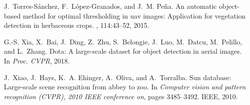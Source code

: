\documentclass[10pt,journal,compsoc]{IEEEtran}
\begin{document}
\begin{thebibliography}{10}
J.~Torres-S{\'a}nchez, F.~L{\'o}pez-Granados, and J.~M. Pe{\~n}a.
\newblock An automatic object-based method for optimal thresholding in uav
  images: Application for vegetation detection in herbaceous crops.
, 114:43--52, 2015.

G.-S. Xia, X.~Bai, J.~Ding, Z.~Zhu, S.~Belongie, J.~Luo, M.~Datcu, M.~Pelillo,
  and L.~Zhang.
\newblock Dota: A large-scale dataset for object detection in aerial images.
\newblock In {\em Proc. CVPR}, 2018.

J.~Xiao, J.~Hays, K.~A. Ehinger, A.~Oliva, and A.~Torralba.
\newblock Sun database: Large-scale scene recognition from abbey to zoo.
\newblock In {\em Computer vision and pattern recognition (CVPR), 2010 IEEE
  conference on}, pages 3485--3492. IEEE, 2010.

\end{thebibliography}




%










\end{document}
